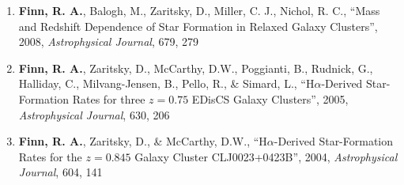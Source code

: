 \documentclass[11pt]{article}
\begin{document}
\begin{flushleft}
\begin{enumerate}{\setlength{\leftmargin}{0in}}
\item {\bf Finn, R. A.}, Balogh, M., Zaritsky, D., Miller, C. J., Nichol, R. C., 
``Mass and Redshift Dependence of Star Formation in Relaxed Galaxy Clusters'', 2008, {\it Astrophysical Journal}, 679, 279
\vspace{-.2cm}
\item {\bf Finn, R. A.}, Zaritsky, D., McCarthy, D.W., Poggianti, B., Rudnick, G., Halliday, C., Milvang-Jensen, B., Pello, R., \& Simard, L., 
``H$\alpha$-Derived Star-Formation Rates for three $z=0.75$ EDisCS Galaxy Clusters'', 2005, {\it Astrophysical Journal}, 630, 206
\vspace{-.2cm}
\item {\bf Finn, R. A.}, Zaritsky, D., \& McCarthy, D.W.,
``H$\alpha$-Derived Star-Formation Rates for the $z=0.845$ Galaxy Cluster CLJ0023+0423B'', 2004, {\it Astrophysical Journal}, 604, 141

\end{enumerate}
\end{flushleft}
\end{document}
